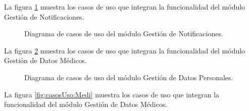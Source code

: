 La figura \ref{fig:casosUso:noti} muestra los casos de uso que integran la funcionalidad del módulo Gestión de Notificaciones.
%
\begin{figure}[htpb!]
	\begin{center}
		\caption{Diagrama de casos de uso del módulo Gestión de Notificaciones. \label{fig:casosUso:noti}}
	\end{center}
\end{figure}
\clearpage


La figura \ref{fig:casosUso:pero} muestra los casos de uso que integran la funcionalidad del módulo Gestión de Datos Médicos.

\begin{figure}[htpb!]
	\begin{center}
		\caption{Diagrama de casos de uso del módulo Gestión de Datos Personales. \label{fig:casosUso:pero}}
	\end{center}
\end{figure}
\clearpage

La figura \ref{fig:casosUso:Medi} muestra los casos de uso que integran la funcionalidad del módulo Gestión de Datos Médicos.

